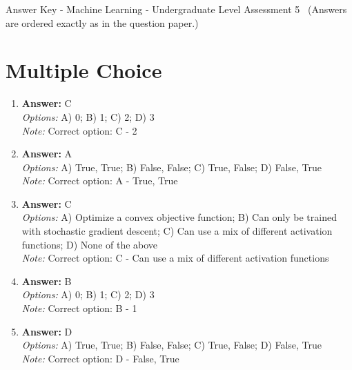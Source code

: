 \documentclass[12pt]{article}
\begin{document}
\begin{center}
Answer Key - Machine Learning - Undergraduate Level Assessment 5 \
\small (Answers are ordered exactly as in the question paper.)
\end{center}

\section*{Multiple Choice}
\begin{enumerate}[label=\arabic*.]
\item \textbf{Answer:} C
\\ \textit{Options:} A) 0; B) 1; C) 2; D) 3
\\ \textit{Note:} Correct option: C - 2
\item \textbf{Answer:} A
\\ \textit{Options:} A) True, True; B) False, False; C) True, False; D) False, True
\\ \textit{Note:} Correct option: A - True, True
\item \textbf{Answer:} C
\\ \textit{Options:} A) Optimize a convex objective function; B) Can only be trained with stochastic gradient descent; C) Can use a mix of different activation functions; D) None of the above
\\ \textit{Note:} Correct option: C - Can use a mix of different activation functions
\item \textbf{Answer:} B
\\ \textit{Options:} A) 0; B) 1; C) 2; D) 3
\\ \textit{Note:} Correct option: B - 1
\item \textbf{Answer:} D
\\ \textit{Options:} A) True, True; B) False, False; C) True, False; D) False, True
\\ \textit{Note:} Correct option: D - False, True
\end{enumerate}
\end{document}
